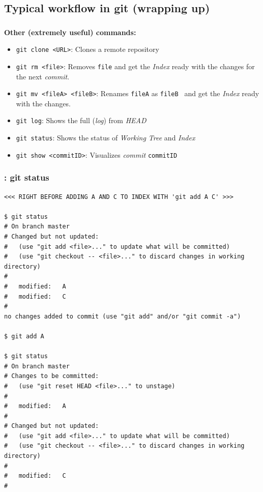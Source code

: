 \subsection{Typical workflow in git (wrapping up)}

\begin{frame}
  \frametitle{\insertsubsection}

  \textbf{Other (extremely useful) commands:}
  \begin{itemize}

  \item \texttt{git clone <URL>}: Clones a remote repository
    \vspacing

  \item \texttt{git rm <file>}: Removes \texttt{file} and get the
    \textit{Index} ready with the changes for the next
    \textit{commit}. \vspacing

  \item \texttt{git mv <fileA> <fileB>}: Renames \texttt{fileA} as
    \texttt{fileB } and get the \textit{Index} ready with the changes.  \vspacing

  \item \texttt{git log}: Shows the full (\textit{log}) from
    \textit{HEAD} \vspacing

  \item \texttt{git status}: Shows the status of \textit{Working
      Tree} and \textit{Index} \vspacing

  \item \texttt{git show <commitID>}: Visualizes \textit{commit}
    \texttt{commitID} \vspacing
  \end{itemize}
\end{frame}


\begin{frame}[fragile]
  \frametitle{\insertsubsection: git status}

  \begin{tiny}
\begin{verbatim}
<<< RIGHT BEFORE ADDING A AND C TO INDEX WITH 'git add A C' >>>

$ git status
# On branch master
# Changed but not updated:
#   (use "git add <file>..." to update what will be committed)
#   (use "git checkout -- <file>..." to discard changes in working directory)
#
#	modified:   A
#	modified:   C
#
no changes added to commit (use "git add" and/or "git commit -a")

$ git add A

$ git status
# On branch master
# Changes to be committed:
#   (use "git reset HEAD <file>..." to unstage)
#
#	modified:   A
#
# Changed but not updated:
#   (use "git add <file>..." to update what will be committed)
#   (use "git checkout -- <file>..." to discard changes in working directory)
#
#	modified:   C
#

\end{verbatim}
  \end{tiny}

\end{frame}

